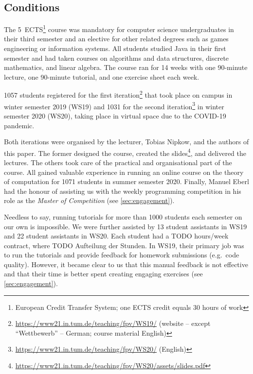 \subsection{Conditions}

The 5~ECTS\footnote{European Credit Transfer System; one ECTS credit equals 30 hours of work} course was mandatory for computer science undergraduates in their third semester and
an elective for other related degrees such as games engineering or information systems.
All students studied Java in their first semester and had taken courses on algorithms and data structures,
discrete mathematics, and linear algebra.
The course ran for 14 weeks with
one 90-minute lecture,
one 90-minute tutorial,
and one exercise sheet each week.

1057 students registered for
the first iteration\footnote{\url{https://www21.in.tum.de/teaching/fpv/WS19/} (website -- except ``Wettbewerb'' -- German; course material English)} that took place on campus in winter semester 2019 (WS19) and
1031 for the second iteration\footnote{\url{https://www21.in.tum.de/teaching/fpv/WS20/} (English)} in winter semester 2020 (WS20), taking place in virtual space due to the COVID-19 pandemic.

Both iterations were organised by the lecturer, Tobias Nipkow, and the authors of this paper.
The former designed the course, created the slides\footnote{\url{https://www21.in.tum.de/teaching/fpv/WS20/assets/slides.pdf}}, and delivered the lectures.
The others took care of the practical and organisational part of the course.
All gained valuable experience in running an online course on the theory of computation for 1071
students in summer semester 2020.
Finally, Manuel Eberl had the honour of assisting us with the weekly programming competition in his role as the \emph{Master of Competition} (see \cref{sec:engagement}).

Needless to say,
running tutorials for more than 1000
students each semester on our own is impossible.
We were further assisted by
13 student assistants in WS19 and
22 student assistants in WS20.
Each student had a TODO hours/week contract,
where TODO Aufteilung der Stunden.
In WS19, their primary job was to run the tutorials and provide feedback for homework submissions (e.g.\ code quality).
However, it became clear to us
that this manual feedback is not effective
and that their time is better spent creating engaging exercises (see \cref{sec:engagement}).


